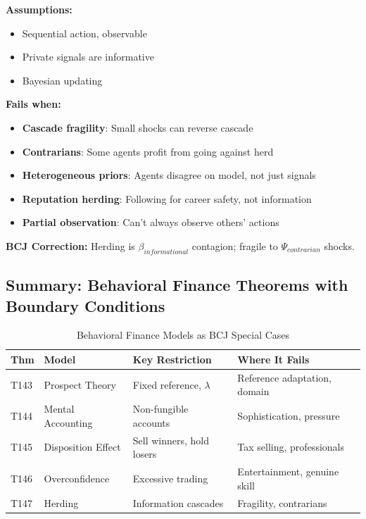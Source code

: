 \begin{tcolorbox}[colback=red!5!white, colframe=red!75!black, title=Boundary Condition: Where Herding Model Fails]
\textbf{Assumptions:}
\begin{itemize}[nosep]
\item Sequential action, observable
\item Private signals are informative
\item Bayesian updating
\end{itemize}

\textbf{Fails when:}
\begin{itemize}[nosep]
\item \textbf{Cascade fragility}: Small shocks can reverse cascade
\item \textbf{Contrarians}: Some agents profit from going against herd
\item \textbf{Heterogeneous priors}: Agents disagree on model, not just signals
\item \textbf{Reputation herding}: Following for career safety, not information
\item \textbf{Partial observation}: Can't always observe others' actions
\end{itemize}

\textbf{BCJ Correction:} Herding is $\beta_{informational}$ contagion; fragile to $\Psi_{contrarian}$ shocks.
\end{tcolorbox}

\subsection{Summary: Behavioral Finance Theorems with Boundary Conditions}

\begin{table}[htbp]
\centering
\caption{Behavioral Finance Models as BCJ Special Cases}
\label{tab:behav-finance-boundaries}
\renewcommand{\arraystretch}{1.2}
\begin{tabular}{@{}llp{3.5cm}p{4cm}@{}}
\toprule
\textbf{Thm} & \textbf{Model} & \textbf{Key Restriction} & \textbf{Where It Fails} \\
\midrule
T143 & Prospect Theory & Fixed reference, $\lambda$ & Reference adaptation, domain \\
T144 & Mental Accounting & Non-fungible accounts & Sophistication, pressure \\
T145 & Disposition Effect & Sell winners, hold losers & Tax selling, professionals \\
T146 & Overconfidence & Excessive trading & Entertainment, genuine skill \\
T147 & Herding & Information cascades & Fragility, contrarians \\
\bottomrule
\end{tabular}
\end{table}


